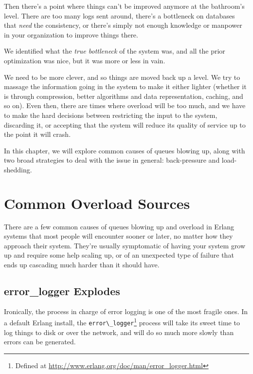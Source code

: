 \documentclass[11pt, oneside]{book}   	%
\newcommand{\module}[1]{\Verb`#1`}
\begin{document}
Then there's a point where things can't be improved anymore at the bathroom's level. There are too many logs sent around, there's a bottleneck on databases that \emph{need} the consistency, or there's simply not enough knowledge or manpower in your organization to improve things there.

\FloatBarrier

We identified what the \emph{true bottleneck} of the system was, and all the prior optimization was nice, but it was more or less in vain.

We need to be more clever, and so things are moved back up a level. We try to massage the information going in the system to make it either lighter (whether it is through compression, better algorithms and data representation, caching, and so on). Even then, there are times where overload will be too much, and we have to make the hard decisions between restricting the input to the system, discarding it, or accepting that the system will reduce its quality of service up to the point it will crash.

In this chapter, we will explore common causes of queues blowing up, along with two broad strategies to deal with the issue in general: back-pressure and load-shedding.

\section{Common Overload Sources}

There are a few common causes of queues blowing up and overload in Erlang systems that most people will encounter sooner or later, no matter how they approach their system. They're usually symptomatic of having your system grow up and require some help scaling up, or of an unexpected type of failure that ends up cascading much harder than it should have.

\subsection{error\_logger Explodes}

Ironically, the process in charge of error logging is one of the most fragile ones. In a default Erlang install, the \module{error\_logger}\footnote{Defined at \href{http://www.erlang.org/doc/man/error\_logger.html}{http://www.erlang.org/doc/man/error\_logger.html}} process will take its sweet time to log things to disk or over the network, and will do so much more slowly than errors can be generated.
\end{document}
